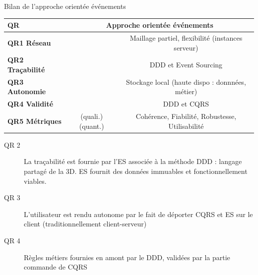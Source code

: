 \begin{frame}{Bilan de l'approche orientée événements}
\begin{table}
	\begin{tabular}{lcc}
	\hline
	\textbf{QR}              & \multicolumn{2}{c}{\textbf{Approche orientée 
	événements}}  \\ 
	\hline
	\textbf{QR1 Réseau}      & \tick                             & Maillage partiel, flexibilité 
	(instances serveur)      \\
	\textbf{QR2 Traçabilité}  &          \tick                        & DDD et Event 
	Sourcing             \\
	\textbf{QR3 Autonomie}   & \tick                       & Stockage local 
	(haute dispo : donnnées, métier)      \\
	\textbf{QR4 Validité}    &     \tick                           &   DDD et CQRS               
	\\
	\textbf{QR5 Métriques}   & \tick (quali.)   \tickpartial 
	(quant.)                        &  Cohérence, Fiabilité, Robustesse, 
	Utilisabilité                           
	\\ 
	\hline
\end{tabular}
\end{table}
	\begin{description}

	\item[QR 2] La traçabilité est fournie par l'ES associée à la méthode DDD : 
	langage partagé de la 3D. ES fournit des données immuables et  
	fonctionnellement viables.
	
	\item[QR 3] L'utilisateur est rendu autonome par le fait de déporter CQRS et 
	ES 
	sur le client (traditionnellement client-serveur)
	
	\item[QR 4] Règles métiers fournies en amont par le DDD, validées par la 
	partie commande de CQRS
	
\end{description}
\end{frame}

